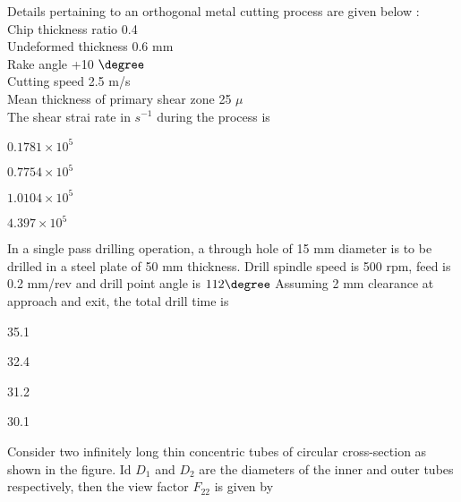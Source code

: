 \iffalse
\title{GATE Questions 8}
\author{EE24BTECH11012 - Bhavanisankar G S}
\section{me}
\chapter{2012}
\fi
	\item Details pertaining to an orthogonal metal cutting process are given below :\\
		Chip thickness ratio 	0.4 \\
		Undeformed thickness 	0.6 mm \\
		Rake angle 	+10 $\degree$ \\
		Cutting speed 	2.5 m/s \\
		Mean thickness of primary shear zone 	25 $\mu$ \\
	The shear strai rate in $s^{-1}$ during the process is
		\begin{enumerate}
		\end{enumerate}
	\item In a single pass drilling operation, a through hole of 15 mm diameter is to be drilled in a steel plate of 50 mm thickness. Drill spindle speed is 500 rpm, feed is 0.2 mm/rev and drill point angle is $112 \degree$ Assuming 2 mm clearance at approach and exit, the total drill time  is
		\begin{enumerate}
				\begin{multicols}{4}
				\item 35.1
				\item 32.4
				\item 31.2
				\item 30.1
				\end{multicols}
		\end{enumerate}
	\item Consider two infinitely long thin concentric tubes of circular cross-section as shown in the figure. Id $D_1$ and $D_2$ are the diameters of the inner and outer tubes respectively, then the view factor $F_{22}$ is given by
